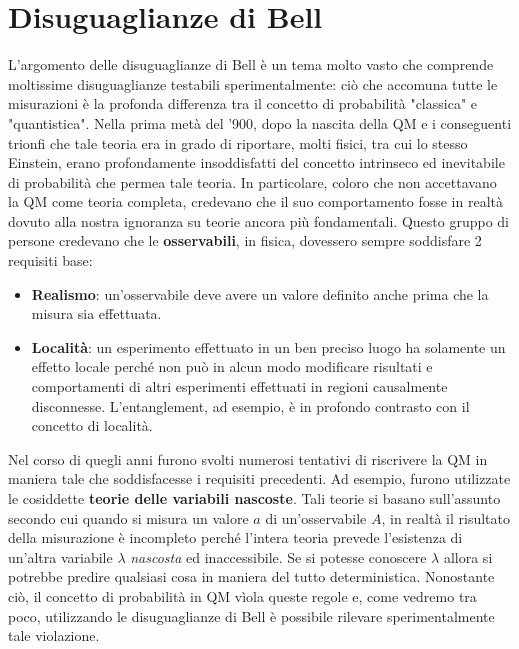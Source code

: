 \section{Disuguaglianze di Bell}
L'argomento delle disuguaglianze di Bell è un tema molto vasto che comprende moltissime disuguaglianze testabili sperimentalmente: ciò che accomuna tutte le misurazioni è la profonda differenza tra il concetto di probabilità "classica" e "quantistica". Nella prima metà del '900, dopo la nascita della QM e i conseguenti trionfi che tale teoria era in grado di riportare, molti fisici, tra cui lo stesso Einstein, erano profondamente insoddisfatti del concetto intrinseco ed inevitabile di probabilità che permea tale teoria. In particolare, coloro che non accettavano la QM come teoria completa, credevano che il suo comportamento fosse in realtà dovuto alla nostra ignoranza su teorie ancora più fondamentali. Questo gruppo di persone credevano che le \textbf{osservabili}, in fisica, dovessero sempre soddisfare 2 requisiti base:
\begin{itemize}
    \item \textbf{Realismo}: un'osservabile deve avere un valore definito anche prima che la misura sia effettuata.
    
    \item \textbf{Località}: un esperimento effettuato in un ben preciso luogo ha solamente un effetto locale perché non può in alcun modo modificare risultati e comportamenti di altri esperimenti effettuati in regioni causalmente disconnesse. L'entanglement, ad esempio, è in profondo contrasto con il concetto di località. 
\end{itemize}

\noindent Nel corso di quegli anni furono svolti numerosi tentativi di riscrivere la QM in maniera tale che soddisfacesse i requisiti precedenti. Ad esempio, furono utilizzate le cosiddette \textbf{teorie delle variabili nascoste}. Tali teorie si basano sull'assunto secondo cui quando si misura un valore $a$ di un'osservabile $A$, in realtà il risultato della misurazione è incompleto perché l'intera teoria prevede l'esistenza di un'altra variabile $\lambda$ \textit{nascosta} ed inaccessibile. Se si potesse conoscere $\lambda$ allora si potrebbe predire qualsiasi cosa in maniera del tutto deterministica. Nonostante ciò, il concetto di probabilità in QM vìola queste regole e, come vedremo tra poco, utilizzando le disuguaglianze di Bell è possibile rilevare sperimentalmente tale violazione. 

